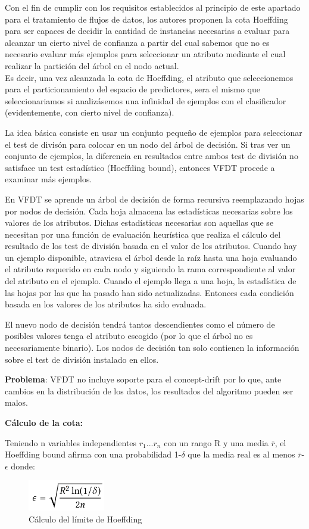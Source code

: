 Con el fin de cumplir con los requisitos establecidos al principio de este apartado para el tratamiento de flujos de datos, los autores proponen la cota Hoeffding para ser capaces de decidir la cantidad de instancias necesarias a evaluar para alcanzar un cierto nivel de confianza a partir del cual sabemos que no es necesario evaluar más ejemplos para seleccionar un atributo mediante el cual realizar la partición del árbol en el nodo actual.\\
Es decir, una vez alcanzada la cota de Hoeffding, el atributo que seleccionemos para el particionamiento del espacio de predictores, sera el mismo que seleccionariamos si analizásemos una infinidad de ejemplos con el clasificador (evidentemente, con cierto nivel de confianza).

La idea básica consiste en usar un conjunto pequeño de ejemplos para seleccionar el test de divisón para colocar en un nodo del árbol de decisión.
Si tras ver un conjunto de ejemplos, la diferencia en resultados entre ambos test de división no satisface un test estadístico (Hoeffding bound), entonces VFDT procede a examinar más ejemplos.

En VFDT se aprende un árbol de decisión de forma recursiva reemplazando hojas por nodos de decisión. Cada hoja almacena las estadísticas necesarias sobre los valores de los
atributos. Dichas estadísticas necesarias son aquellas que se necesitan por una función de evaluación heurística que realiza el cálculo del resultado de los test de división 
basada en el valor de los atributos.
Cuando hay un ejemplo disponible, atraviesa el árbol desde la raíz hasta una hoja evaluando el atributo requerido en cada nodo y siguiendo la rama correspondiente al valor
del atributo en el ejemplo.
Cuando el ejemplo llega a una hoja, la estadística de las hojas por las que ha pasado han sido actualizadas.
Entonces cada condición basada en los valores de los atributos ha sido evaluada.

El nuevo nodo de decisión tendrá tantos descendientes como el número de posibles valores tenga el atributo escogido (por lo que el árbol no es necesariamente binario).
Los nodos de decisión tan solo contienen la información sobre el test de división instalado en ellos.

\textbf{Problema}: VFDT no incluye soporte para el concept-drift por lo que, ante cambios en la distribución de los datos, los resultados del algoritmo pueden ser malos.

\textbf{Cálculo de la cota:}

Teniendo n variables independientes $r_{1}...r_{n}$ con un rango R y una media $\bar{r}$, el Hoeffding bound afirma con una probabilidad 1-$\delta$ que la media real es al menos $\bar{r}$-$\epsilon$ donde:
\begin{figure}[H]
	\centering
	\includegraphics[width=0.3\textwidth]{imagenes/hoeffdingbound} 
	\caption{Cálculo del límite de Hoeffding \cite{ref10}}
\end{figure}

